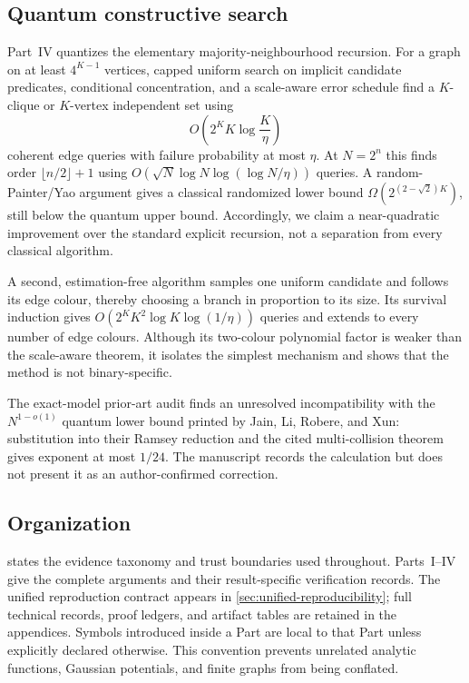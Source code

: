 \subsection{Quantum constructive search}

Part~IV quantizes the elementary majority-neighbourhood recursion.  For a
graph on at least $4^{K-1}$ vertices, capped uniform search on implicit
candidate predicates, conditional concentration, and a scale-aware error
schedule find a $K$-clique or $K$-vertex independent set using
\[
 O\!\left(2^K K\log\frac K\eta\right)
\]
coherent edge queries with failure probability at most $\eta$.  At
$N=2^n$ this finds order $\lfloor n/2\rfloor+1$ using
$O(\sqrt N\log N\log(\log N/\eta))$ queries.  A random-Painter/Yao argument
gives a classical randomized lower bound
$\Omega(2^{(2-\sqrt2)K})$, still below the quantum upper bound.  Accordingly,
we claim a near-quadratic improvement over the standard explicit recursion,
not a separation from every classical algorithm.

A second, estimation-free algorithm samples one uniform candidate and follows
its edge colour, thereby choosing a branch in proportion to its size.  Its
survival induction gives
$O(2^K K^2\log K\log(1/\eta))$ queries and extends to every number of edge
colours.  Although its two-colour polynomial factor is weaker than the
scale-aware theorem, it isolates the simplest mechanism and shows that the
method is not binary-specific.

The exact-model prior-art audit finds an unresolved incompatibility with the
$N^{1-o(1)}$ quantum lower bound printed by Jain, Li, Robere, and Xun:
substitution into their Ramsey reduction and the cited multi-collision theorem
gives exponent at most $1/24$.  The manuscript records the calculation but
does not present it as an author-confirmed correction.

\subsection{Organization}

 states the evidence taxonomy and trust
boundaries used throughout.  Parts~I--IV give the complete arguments and
their result-specific verification records.  The unified reproduction
contract appears in \cref{sec:unified-reproducibility}; full technical
records, proof ledgers, and artifact tables are retained in the appendices.
Symbols introduced inside a Part are local to that Part unless explicitly
declared otherwise.  This convention prevents unrelated analytic functions,
Gaussian potentials, and finite graphs from being conflated.
